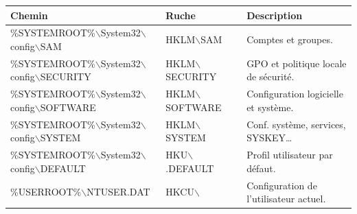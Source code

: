\documentclass[a4paper,11pt]{article}				    %
\begin{document}
{
{
\footnotesize
\begin{tabular}{|l|l|l|}
\hline
\textbf{Chemin} & \textbf{Ruche} & \textbf{Description}\\\hline\hline
\%SYSTEMROOT\%$\backslash$System32$\backslash$config$\backslash$SAM & HKLM$\backslash$SAM & {\footnotesize Comptes et groupes.}\\\hline
\%SYSTEMROOT\%$\backslash$System32$\backslash$config$\backslash$SECURITY	& HKLM$\backslash$SECURITY & {\footnotesize GPO et politique locale de s\'ecurit\'e.}\\\hline
\%SYSTEMROOT\%$\backslash$System32$\backslash$config$\backslash$SOFTWARE & HKLM$\backslash$SOFTWARE & {\footnotesize Configuration logicielle et syst\`eme.}\\\hline
\%SYSTEMROOT\%$\backslash$System32$\backslash$config$\backslash$SYSTEM & HKLM$\backslash$SYSTEM & {\footnotesize Conf. syst\`eme, services, SYSKEY\dots{}}\\\hline
\%SYSTEMROOT\%$\backslash$System32$\backslash$config$\backslash$DEFAULT & HKU$\backslash$.DEFAULT & {\footnotesize Profil utilisateur par d\'efaut.}\\\hline
\%USERROOT\%$\backslash$NTUSER.DAT & HKCU$\backslash$ & {\footnotesize Configuration de l'utilisateur actuel.}\\\hline
\end{tabular}
}

}
\end{document}
